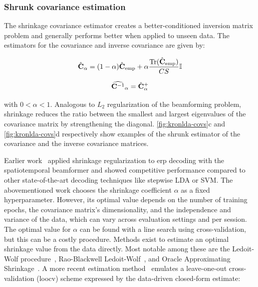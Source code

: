 	\subsubsection{Shrunk covariance estimation}
	\label{sec:shrunk_covariance}
	The shrinkage covariance estimator creates a better-conditioned inversion matrix problem and generally performs better when applied to unseen data.
	The estimators for the covariance and inverse covariance are given by:

	\begin{equation}
    \hat{\mathbf{C}}_\alpha =
    (1-\alpha) \hat{\mathbf{C}}_\text{emp}
    + \alpha\frac{\text{Tr}(\hat{\mathbf{C}}_\text{emp})}{CS}\mathbb{I}
		\label{eq:shrinkage}
	\end{equation}


	\begin{equation}
    \widehat{\mathbf{C}^{-1}}_\alpha =
    \hat{\mathbf{C}}^+_\alpha
		\label{eq:shrinkage_inverse}
	\end{equation}

	with $0<\alpha<1$.
	Analogous to $L_2$ regularization of the beamforming problem,
	shrinkage reduces the ratio between the smallest and largest eigenvalues
	of the covariance matrix by strengthening the diagonal.
	\cref{fig:kronlda-covs}c and \cref{fig:kronlda-covs}d respectively show examples of the
	shrunk estimator of the covariance and the inverse covariance matrices.

	Earlier work~\cite{Libert2021} applied shrinkage regularization to \ac{erp}
	decoding with the spatiotemporal beamformer and showed competitive performance
	compared to other state-of-the-art decoding techniques like stepwise LDA or SVM.
	The abovementioned work chooses the shrinkage coefficient $\alpha$ as a fixed hyperparameter.
	However, its optimal value depends on the number of training epochs, the
	covariance matrix's dimensionality, and the independence and variance of the
	data, which can vary across evaluation settings and per session.
	The optimal value for $\alpha$ can be found with a line search using cross-validation, but this can be a costly procedure.
	Methods exist to estimate an optimal shrinkage value from the data directly.
	Most notable among these are the Ledoit-Wolf procedure~\cite{Ledoit2004},
	Rao-Blackwell Ledoit-Wolf~\cite{Chen2010}, and Oracle Approximating Shrinkage~\cite{Chen2010}.
	A more recent estimation method~\cite{Tong2018} emulates a leave-one-out
	cross-validation (\ac{loocv}) scheme expressed by the data-driven closed-form
	estimate:

